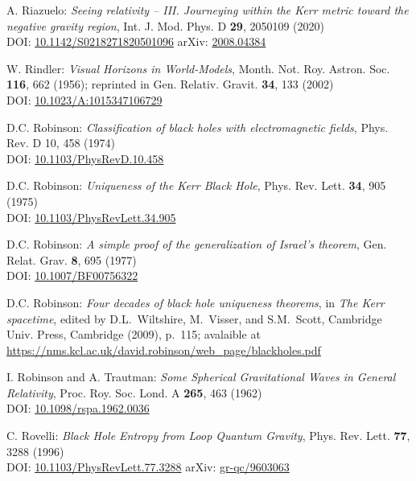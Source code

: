 \begin{thebibliography}{123}
A. Riazuelo:
{\em Seeing relativity -- III. Journeying within the Kerr metric toward the negative gravity region},
Int. J. Mod. Phys. D {\bf 29}, 2050109 (2020)\\
DOI: \href{https://doi.org/10.1142/S0218271820501096}{10.1142/S0218271820501096}\hfill
arXiv: \href{https://arxiv.org/abs/2008.04384}{2008.04384}

W. Rindler: {\em Visual Horizons in World-Models},
Month. Not. Roy. Astron. Soc. {\bf 116}, 662 (1956);
reprinted in Gen. Relativ. Gravit. {\bf 34}, 133 (2002)\\
DOI: \href{https://doi.org/10.1023/A:1015347106729}{10.1023/A:1015347106729}

D.C. Robinson:
{\em Classification of black holes with electromagnetic fields},
Phys. Rev. D 10, 458 (1974)\\
DOI: \href{https://doi.org/10.1103/PhysRevD.10.458}{10.1103/PhysRevD.10.458}

D.C. Robinson:
{\em Uniqueness of the Kerr Black Hole},
Phys. Rev. Lett. {\bf 34}, 905 (1975)\\
DOI: \href{https://doi.org/10.1103/PhysRevLett.34.905}{10.1103/PhysRevLett.34.905}

D.C. Robinson:
{\em A simple proof of the generalization of Israel's theorem},
Gen. Relat. Grav. {\bf 8}, 695 (1977)\\
DOI: \href{https://doi.org/10.1007/BF00756322}{10.1007/BF00756322}

D.C. Robinson:
{\em Four decades of black hole uniqueness theorems},
in {\em The Kerr spacetime}, edited by D.L.~Wiltshire, M.~Visser, and S.M.~Scott,
Cambridge Univ. Press, Cambridge (2009), p.~115; avalaible at\\
\url{https://nms.kcl.ac.uk/david.robinson/web_page/blackholes.pdf}

I. Robinson and A. Trautman:
{\em Some Spherical Gravitational Waves in General Relativity},
Proc. Roy. Soc. Lond. A {\bf 265}, 463 (1962)\\
DOI: \href{https://doi.org/10.1098/rspa.1962.0036}{10.1098/rspa.1962.0036}

C. Rovelli:
{\em Black Hole Entropy from Loop Quantum Gravity},
Phys. Rev. Lett. {\bf 77}, 3288 (1996)\\
DOI: \href{https://doi.org/10.1103/PhysRevLett.77.3288}{10.1103/PhysRevLett.77.3288}\hfill
arXiv: \href{https://arxiv.org/abs/gr-qc/9603063}{gr-qc/9603063}


\end{thebibliography}
